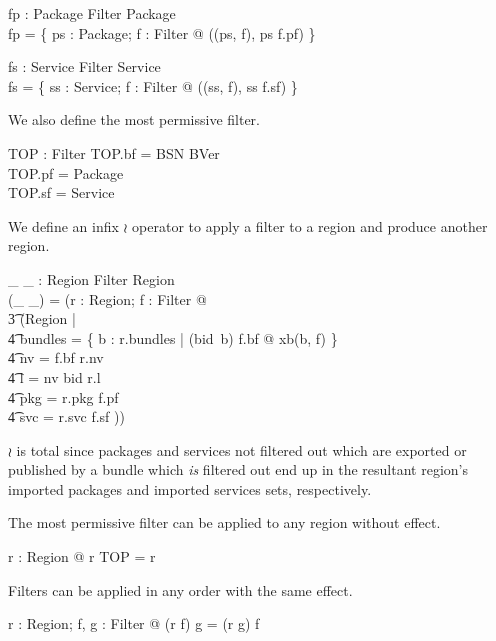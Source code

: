 \documentclass[a4paper,9pt]{article}
\begin{document}
\begin{axdef}
  fp : \power Package \cross Filter \fun \power Package \\
\where
  fp = \{ ps : \power Package; f : Filter @ ((ps, f), ps \cap f.pf) \}
\end{axdef}

\begin{axdef}
  fs : \power Service \cross Filter \fun \power Service \\
\where
  fs = \{ ss : \power Service; f : Filter @ ((ss, f), ss \cap f.sf) \}
\end{axdef}

We also define the most permissive filter.
\begin{axdef}
  TOP : Filter
\where
  TOP.bf = BSN \cross BVer \\
  TOP.pf = Package \\
  TOP.sf = Service \\
\end{axdef}

We define an infix $\wr$ operator to apply a filter to a region and produce another region.
\begin{axdef}
  \_ \wr \_ : Region \cross Filter \fun Region \\
\where
  (\_ \wr \_) = (\lambda r : Region;  f : Filter @ \\
\t3   (\mu Region | \\
\t4 bundles = \{ b : r.bundles | (bid~b) \in f.bf @ xb(b, f) \} \land \\
\t4 nv = f.bf \dres r.nv \land \\
\t4 l = nv \circ bid \circ r.l \land \\
\t4 pkg = r.pkg \cap f.pf \land \\
\t4 svc = r.svc \cap f.sf )) \\
\end{axdef}
$\wr$ is total since packages and services not filtered out which are exported or published by a
bundle which \textit{is} filtered out end up
in the resultant region's imported packages and imported services sets, respectively.

The most permissive filter can be applied to any region without effect.
\begin{argue}
  \shows \forall r : Region @ r \wr TOP = r \\
\end{argue}

Filters can be applied in any order with the same effect.
\begin{argue}
  \shows \forall r : Region; f, g : Filter @ (r \wr f) \wr g = (r \wr g) \wr f \\
\end{argue}
\end{document}
